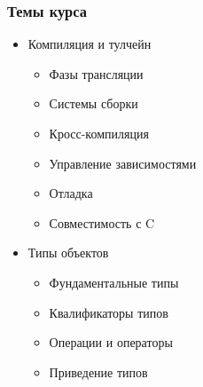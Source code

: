 \documentclass[compress]{beamer}
\subtitle{Введение}
\begin{document}
\frame[plain]{\titlepage}

\begin{frame}

    \frametitle{Темы курса}

    \begin{itemize}

        \item Компиляция и тулчейн

            \begin{itemize}

                \item Фазы трансляции

                \item Системы сборки

                \item Кросс-компиляция

                \item Управление зависимостями

                \item Отладка

                \item Совместимость с C

            \end{itemize}

        \item Типы объектов

            \begin{itemize}

                \item Фундаментальные типы

                \item Квалификаторы типов

                \item Операции и операторы

                \item Приведение типов

            \end{itemize}

    \end{itemize}

\end{frame}
\end{document}
